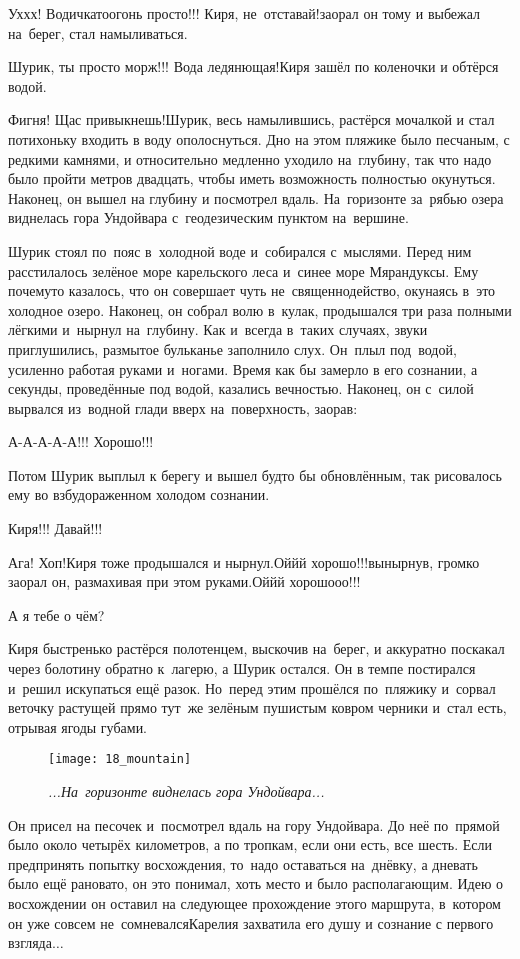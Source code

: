 \diagdash Ух\sdash х\sdash х! Водичка\sdash то\mdash огонь просто!!! Киря, не~отставай!\mdash заорал он тому и выбежал на~берег, стал намыливаться.

\diagdash Шурик, ты просто морж!!! Вода ледянющая!\mdash Киря зашёл по коленочки и обтёрся водой.

\diagdash Фигня! Щас привыкнешь!\mdash Шурик, весь намылившись, растёрся мочалкой и стал потихоньку входить в воду ополоснуться. Дно на этом пляжике было песчаным, с редкими камнями, и относительно медленно уходило на~глубину, так что надо было пройти метров двадцать, чтобы иметь возможность полностью окунуться. Наконец, он вышел на глубину и посмотрел вдаль. На~горизонте за~рябью озера виднелась гора Ундойвара с~геодезическим пунктом на~вершине.  

Шурик стоял по~пояс в~холодной воде и~собирался с~мыслями. Перед ним расстилалось зелёное море карельского леса и~синее море Мярандуксы. Ему почему\sdash то казалось, что он совершает чуть не~священнодейство, окунаясь в~это холодное озеро. Наконец, он собрал волю в~кулак, продышался три раза полными лёгкими и~нырнул на~глубину. Как и~всегда в~таких случаях, звуки приглушились, размытое бульканье заполнило слух. Он~плыл под~водой, усиленно работая руками и~ногами. Время как бы замерло в его сознании, а секунды, проведённые под водой, казались вечностью. Наконец, он с~силой вырвался из~водной глади вверх на~поверхность, заорав:

\diagdash А-А-А-А-А!!! Хорошо!!!
\nopagebreak

Потом Шурик выплыл к берегу и вышел будто бы обновлённым, так рисовалось ему во взбудораженном холодом сознании.

\diagdash Киря!!! Давай!!! 

\diagdash Ага! Хоп!\mdash Киря тоже продышался и нырнул.\mdash Ой\sdash й\sdash й хорошо!!!\mdash вынырнув, громко заорал он, размахивая при этом руками.\mdash Ой\sdash й\sdash й хорошо\sdash о\sdash о!!!

\diagdash А я тебе о чём?

Киря быстренько растёрся полотенцем, выскочив на~берег, и аккуратно поскакал через болотину обратно к~лагерю, а Шурик остался. Он в темпе постирался и~решил искупаться ещё разок. Но~перед этим прошёлся по~пляжику и~сорвал веточку растущей прямо тут~же зелёным пушистым ковром черники и~стал есть, отрывая ягоды губами. 

{
\setlength{\belowcaptionskip}{-5mm}
\begin{figure}[h]
\centering
\texttt{[image: 18\_mountain]}
\caption{\small\textit{...На~горизонте виднелась гора Ундойвара...}}
\end{figure}

Он присел на песочек и~посмотрел вдаль на гору Ундойвара. До неё по~прямой было около четырёх километров, а по тропкам, если они есть, все шесть. Если предпринять попытку восхождения, то~надо оставаться на~днёвку, а дневать было ещё рановато, он это понимал, хоть место и было располагающим. Идею о восхождении он оставил на следующее прохождение этого маршрута, в~котором он уже совсем не~сомневался\mdash Карелия захватила его душу и сознание с первого взгляда$\ldots$ 
}

